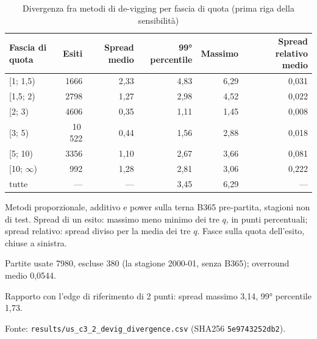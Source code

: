 \begin{table}[htbp]
\centering
\small
\caption{Divergenza fra metodi di de-vigging per fascia di quota (prima riga della sensibilità)}
\label{tab:divergenza_devig}
\begin{tabular}{lrrrrr}
\toprule
Fascia di quota & Esiti & Spread medio & 99° percentile & Massimo & Spread relativo medio \\
\midrule
[1; 1,5) & 1666 & 2,33 & 4,83 & 6,29 & 0,031 \\
[1,5; 2) & 2798 & 1,27 & 2,98 & 4,52 & 0,022 \\
[2; 3) & 4606 & 0,35 & 1,11 & 1,45 & 0,008 \\
[3; 5) & 10\,522 & 0,44 & 1,56 & 2,88 & 0,018 \\
[5; 10) & 3356 & 1,10 & 2,67 & 3,66 & 0,081 \\
[10; $\infty$) & 992 & 1,28 & 2,81 & 3,06 & 0,222 \\
tutte & --- & --- & 3,45 & 6,29 & --- \\
\bottomrule
\end{tabular}

\smallskip
\begin{minipage}{\linewidth}
\footnotesize
Metodi proporzionale, additivo e power sulla terna B365 pre-partita, stagioni non di test. Spread di un esito: massimo meno minimo dei tre $q$, in punti percentuali; spread relativo: spread diviso per la media dei tre $q$. Fasce sulla quota dell'esito, chiuse a sinistra.\par
Partite usate 7980, escluse 380 (la stagione 2000-01, senza B365); overround medio 0,0544.\par
Rapporto con l'edge di riferimento di 2 punti: spread massimo 3,14, 99° percentile 1,73.\par
Fonte: \texttt{results/us\_c3\_2\_devig\_divergence.csv} (SHA256 \texttt{5e9743252db2}).
\end{minipage}
\end{table}
